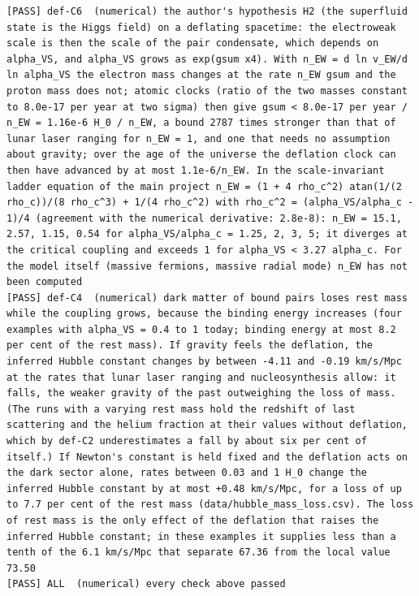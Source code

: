 \documentclass[
  10pt,
]{article}
\begin{document}
\begin{verbatim}
[PASS] def-C6  (numerical) the author's hypothesis H2 (the superfluid state is the Higgs field) on a deflating spacetime: the electroweak scale is then the scale of the pair condensate, which depends on alpha_VS, and alpha_VS grows as exp(gsum x4). With n_EW = d ln v_EW/d ln alpha_VS the electron mass changes at the rate n_EW gsum and the proton mass does not; atomic clocks (ratio of the two masses constant to 8.0e-17 per year at two sigma) then give gsum < 8.0e-17 per year / n_EW = 1.16e-6 H_0 / n_EW, a bound 2787 times stronger than that of lunar laser ranging for n_EW = 1, and one that needs no assumption about gravity; over the age of the universe the deflation clock can then have advanced by at most 1.1e-6/n_EW. In the scale-invariant ladder equation of the main project n_EW = (1 + 4 rho_c^2) atan(1/(2 rho_c))/(8 rho_c^3) + 1/(4 rho_c^2) with rho_c^2 = (alpha_VS/alpha_c - 1)/4 (agreement with the numerical derivative: 2.8e-8): n_EW = 15.1, 2.57, 1.15, 0.54 for alpha_VS/alpha_c = 1.25, 2, 3, 5; it diverges at the critical coupling and exceeds 1 for alpha_VS < 3.27 alpha_c. For the model itself (massive fermions, massive radial mode) n_EW has not been computed
[PASS] def-C4  (numerical) dark matter of bound pairs loses rest mass while the coupling grows, because the binding energy increases (four examples with alpha_VS = 0.4 to 1 today; binding energy at most 8.2 per cent of the rest mass). If gravity feels the deflation, the inferred Hubble constant changes by between -4.11 and -0.19 km/s/Mpc at the rates that lunar laser ranging and nucleosynthesis allow: it falls, the weaker gravity of the past outweighing the loss of mass. (The runs with a varying rest mass hold the redshift of last scattering and the helium fraction at their values without deflation, which by def-C2 underestimates a fall by about six per cent of itself.) If Newton's constant is held fixed and the deflation acts on the dark sector alone, rates between 0.03 and 1 H_0 change the inferred Hubble constant by at most +0.48 km/s/Mpc, for a loss of up to 7.7 per cent of the rest mass (data/hubble_mass_loss.csv). The loss of rest mass is the only effect of the deflation that raises the inferred Hubble constant; in these examples it supplies less than a tenth of the 6.1 km/s/Mpc that separate 67.36 from the local value 73.50
[PASS] ALL  (numerical) every check above passed
\end{verbatim}
\end{document}
